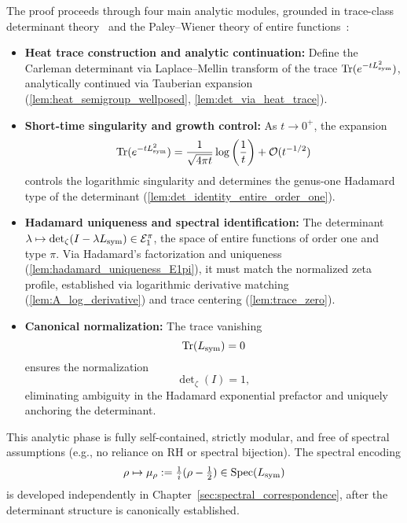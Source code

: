The proof proceeds through four main analytic modules, grounded in trace-class determinant theory~\cite[Ch.~4]{Simon2005TraceIdeals} and the Paley–Wiener theory of entire functions~\cite[Ch.~9]{Levin1996EntireLectures}:

\begin{itemize}
  \item \textbf{Heat trace construction and analytic continuation:} Define the Carleman determinant via Laplace–Mellin transform of the trace \( \operatorname{Tr}(e^{-t L_{\mathrm{sym}}^2}) \), analytically continued via Tauberian expansion (\cref{lem:heat_semigroup_wellposed}, \cref{lem:det_via_heat_trace}).

  \item \textbf{Short-time singularity and growth control:} As \( t \to 0^+ \), the expansion
  \[
  \operatorname{Tr}(e^{-t L_{\mathrm{sym}}^2}) = \frac{1}{\sqrt{4\pi t}} \log\left(\frac{1}{t}\right) + \mathcal{O}(t^{-1/2})
  \]
  controls the logarithmic singularity and determines the genus-one Hadamard type of the determinant (\cref{lem:det_identity_entire_order_one}).

  \item \textbf{Hadamard uniqueness and spectral identification:} The determinant \( \lambda \mapsto \det_\zeta(I - \lambda L_{\mathrm{sym}}) \in \mathcal{E}_1^\pi \), the space of entire functions of order one and type \( \pi \). Via Hadamard's factorization and uniqueness (\cref{lem:hadamard_uniqueness_E1pi}), it must match the normalized zeta profile, established via logarithmic derivative matching (\cref{lem:A_log_derivative}) and trace centering (\cref{lem:trace_zero}).

  \item \textbf{Canonical normalization:} The trace vanishing
  \[
  \operatorname{Tr}(L_{\mathrm{sym}}) = 0
  \]
  ensures the normalization
  \[
  \det\nolimits_\zeta(I) = 1,
  \]
  eliminating ambiguity in the Hadamard exponential prefactor and uniquely anchoring the determinant.
\end{itemize}

\medskip

This analytic phase is fully self-contained, strictly modular, and free of spectral assumptions (e.g., no reliance on RH or spectral bijection). The spectral encoding
\[
\rho \mapsto \mu_\rho := \tfrac{1}{i}(\rho - \tfrac{1}{2}) \in \operatorname{Spec}(L_{\mathrm{sym}})
\]
is developed independently in Chapter~\ref{sec:spectral_correspondence}, after the determinant structure is canonically established.
